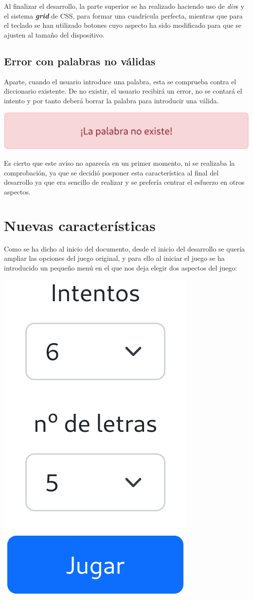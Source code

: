 \documentclass{\ClassPath/viu-tfm-template}
\begin{document}
Al finalizar el desarrollo, la parte superior se ha realizado haciendo uso de \textit{div}s y el sistema \textbf{\textit{grid}} de CSS, para formar una cuadrícula perfecta, mientras que para el teclado se han utilizado botones cuyo aspecto ha sido modificado para que se ajusten al tamaño del dispositivo.


\subsection{Error con palabras no válidas}
Aparte, cuando el usuario introduce una palabra, esta se comprueba contra el diccionario existente. De no existir, el usuario recibirá un error, no se contará el intento y por tanto deberá borrar la palabra para introducir una válida.

\vspace{-1em}
\begin{center}
    \includegraphics[width=0.7\linewidth]{img/error.png}
\end{center}
\vspace{-1em}

Es cierto que este aviso no aparecía en un primer momento, ni se realizaba la comprobación, ya que se decidió posponer esta característica al final del desarrollo ya que era sencillo de realizar y se prefería centrar el esfuerzo en otros aspectos.


\section{Nuevas características}
Como se ha dicho al inicio del documento, desde el inicio del desarrollo se quería ampliar las opciones del juego original, y para ello al iniciar el juego se ha introducido un pequeño menú en el que nos deja elegir dos aspectos del juego:

\vspace{-1em}
\begin{center}
    \includegraphics[width=0.2\linewidth]{img/opciones.png}
\end{center}
\vspace{-1em}
\end{document}
